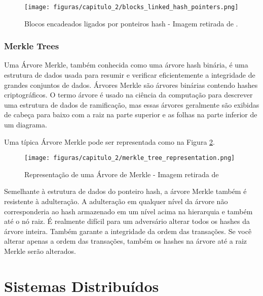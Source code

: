                \begin{figure}[h]
                     \centering
                     \texttt{[image: figuras/capitulo\_2/blocks\_linked\_hash\_pointers.png]}
                     \caption{Blocos encadeados ligados por ponteiros hash - Imagem retirada de \cite{beginnig_blockchain_bikramaditya}.}
                     \label{fig:blocks_linked_hash_pointers}
                \end{figure}


        \subsubsection{Merkle Trees}
  
            Uma Árvore Merkle, também conhecida como uma árvore hash binária, é uma estrutura de dados usada para resumir e verificar eficientemente a integridade de grandes conjuntos de dados. Árvores Merkle são árvores binárias contendo hashes criptográficos. O termo árvore é usado na ciência da computação para descrever uma estrutura de dados de ramificação, mas essas árvores geralmente são exibidas de cabeça para baixo com a raiz na parte superior e as folhas na parte inferior de um diagrama.\cite{mastering_blockchain_andreas}
            
            Uma típica Árvore Merkle pode ser representada como na Figura \ref{fig:merkle_tree_representation}.
        
                \begin{figure}[h]
                     \centering
                     \texttt{[image: figuras/capitulo\_2/merkle\_tree\_representation.png]}
                     \caption{Representação de uma Árvore de Merkle - Imagem retirada de \cite{beginnig_blockchain_bikramaditya}}
                     \label{fig:merkle_tree_representation}
                \end{figure}

            Semelhante à estrutura de dados do ponteiro hash, a árvore Merkle também é resistente à adulteração. A adulteração em qualquer nível da árvore não corresponderia ao hash armazenado em um nível acima na hierarquia e também até o nó raiz. É realmente difícil para um adversário alterar todos os hashes da árvore inteira. Também garante a integridade da ordem das transações. Se você alterar apenas a ordem das transações, também os hashes na árvore até a raiz Merkle serão alterados.\cite{beginnig_blockchain_bikramaditya}


\section{Sistemas Distribuídos}

